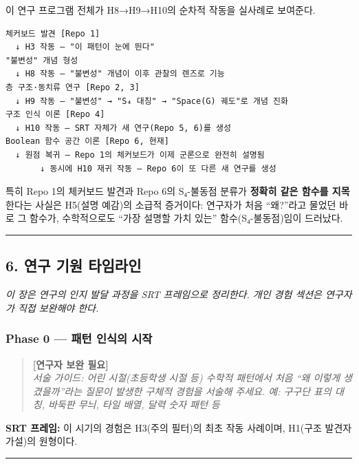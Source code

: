 \documentclass[
]{article}
\begin{document}
이 연구 프로그램 전체가 H8→H9→H10의 순차적 작동을 실사례로 보여준다.

\begin{verbatim}
체커보드 발견 [Repo 1]
  ↓ H3 작동 — "이 패턴이 눈에 띈다"
"불변성" 개념 형성
  ↓ H8 작동 — "불변성" 개념이 이후 관찰의 렌즈로 기능
층 구조·동치류 연구 [Repo 2, 3]
  ↓ H9 작동 — "불변성" → "S₄ 대칭" → "Space(G) 궤도"로 개념 진화
구조 인식 이론 [Repo 4]
  ↓ H10 작동 — SRT 자체가 새 연구(Repo 5, 6)를 생성
Boolean 함수 공간 이론 [Repo 6, 현재]
  ↓ 원점 복귀 — Repo 1의 체커보드가 이제 군론으로 완전히 설명됨
       ↓ 동시에 H10 재귀 작동 — Repo 6이 또 다른 새 연구를 생성
\end{verbatim}

특히 Repo 1의 체커보드 발견과 Repo 6의 S₄-불동점 분류가 \textbf{정확히
같은 함수를 지목}한다는 사실은 H5(설명 예감)의 소급적 증거이다: 연구자가
처음 ``왜?''라고 물었던 바로 그 함수가, 수학적으로도 ``가장 설명할 가치
있는'' 함수(S₄-불동점)임이 드러났다.

\begin{center}\rule{0.5\linewidth}{0.5pt}\end{center}

\subsection{6. 연구 기원
타임라인}\label{uxc5f0uxad6c-uxae30uxc6d0-uxd0c0uxc784uxb77cuxc778}

\emph{이 장은 연구의 인지 발달 과정을 SRT 프레임으로 정리한다. 개인 경험
섹션은 연구자가 직접 보완해야 한다.}

\subsubsection{Phase 0 --- 패턴 인식의
시작}\label{phase-0-uxd328uxd134-uxc778uxc2dduxc758-uxc2dcuxc791}

\begin{quote}
\textbf{{[}연구자 보완 필요{]}}\\
\emph{서술 가이드: 어린 시절(초등학생 시절 등) 수학적 패턴에서 처음 ``왜
이렇게 생겼을까''라는 질문이 발생한 구체적 경험을 서술해 주세요. 예:
구구단 표의 대칭, 바둑판 무늬, 타일 배열, 달력 숫자 패턴 등}
\end{quote}

\textbf{SRT 프레임:} 이 시기의 경험은 H3(주의 필터)의 최초 작동
사례이며, H1(구조 발견자 가설)의 원형이다.

\begin{center}\rule{0.5\linewidth}{0.5pt}\end{center}
\end{document}
